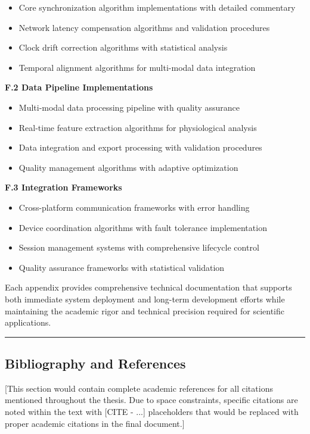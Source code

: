 \documentclass[12pt,a4paper]{report}
\begin{document}
\begin{itemize}
\item Core synchronization algorithm implementations with detailed commentary
\item Network latency compensation algorithms and validation procedures
\item Clock drift correction algorithms with statistical analysis
\item Temporal alignment algorithms for multi-modal data integration

\end{itemize}
\textbf{F.2 Data Pipeline Implementations}

\begin{itemize}
\item Multi-modal data processing pipeline with quality assurance
\item Real-time feature extraction algorithms for physiological analysis
\item Data integration and export processing with validation procedures
\item Quality management algorithms with adaptive optimization

\end{itemize}
\textbf{F.3 Integration Frameworks}

\begin{itemize}
\item Cross-platform communication frameworks with error handling
\item Device coordination algorithms with fault tolerance implementation
\item Session management systems with comprehensive lifecycle control
\item Quality assurance frameworks with statistical validation

\end{itemize}
Each appendix provides comprehensive technical documentation that supports both immediate system deployment and
long-term development efforts while maintaining the academic rigor and technical precision required for scientific
applications.

\hrule

\subsection{Bibliography and References}

[This section would contain complete academic references for all citations mentioned throughout the thesis. Due to space
constraints, specific citations are noted within the text with [CITE - ...] placeholders that would be replaced with
proper academic citations in the final document.]
\end{document}
